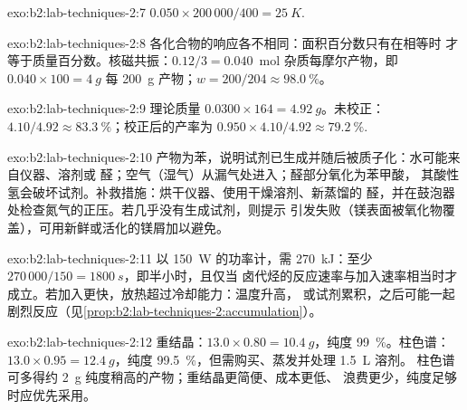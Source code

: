 \begin{solution}{exo:b2:lab-techniques-2:7}
$0.050 \times 200\,000/400 = \qty{25}{K}$.
\end{solution}

\begin{solution}{exo:b2:lab-techniques-2:8}
各化合物的响应各不相同：面积百分数只有在相等时
才等于质量百分数。核磁共振：$0.12/3 = 0.040$~mol 杂质每摩尔产物，即 $0.040 \times 100 = \qty{4}{g}$
每 \qty{200}{g} 产物；$w = 200/204 \approx 98.0~\%$。
\end{solution}

\begin{solution}{exo:b2:lab-techniques-2:9}
理论质量 $0.0300 \times 164 = \qty{4.92}{g}$。未校正：$4.10/4.92 \approx 83.3~\%$；校正后的产率为
$0.950 \times 4.10/4.92 \approx 79.2~\%$.
\end{solution}

\begin{solution}{exo:b2:lab-techniques-2:10}
产物为苯，说明试剂已生成并随后被质子化：水可能来自仪器、溶剂或
醛；空气（湿气）从漏气处进入；醛部分氧化为苯甲酸，
其酸性氢会破坏试剂。补救措施：烘干仪器、使用干燥溶剂、新蒸馏的
醛，并在鼓泡器处检查氮气的正压。若几乎没有生成试剂，则提示
引发失败（镁表面被氧化物覆盖），可用新鲜或活化的镁屑加以避免。
\end{solution}

\begin{solution}{exo:b2:lab-techniques-2:11}
以 \qty{150}{W} 的功率计，需 \qty{270}{kJ}：至少 $270\,000/150 = \qty{1800}{s}$，即半小时，且仅当
卤代烃的反应速率与加入速率相当时才成立。若加入更快，放热超过冷却能力：温度升高，
或试剂累积，之后可能一起剧烈反应（见\cref{prop:b2:lab-techniques-2:accumulation}）。
\end{solution}

\begin{solution}{exo:b2:lab-techniques-2:12}
重结晶：$13.0 \times 0.80 = \qty{10.4}{g}$，纯度 99~\%。柱色谱：$13.0 \times 0.95 =
\qty{12.4}{g}$，纯度 99.5~\%，但需购买、蒸发并处理 \qty{1.5}{L} 溶剂。
柱色谱可多得约 \qty{2}{g} 纯度稍高的产物；重结晶更简便、成本更低、
浪费更少，纯度足够时应优先采用。
\end{solution}

